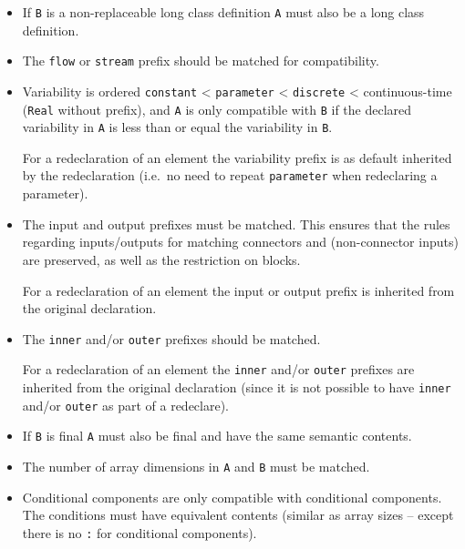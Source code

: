 \begin{itemize}
  \begin{itemize}
  \item
    If \lstinline!B! is a non-replaceable long class definition \lstinline!A! must also be a
    long class definition.
  \item
    The \lstinline!flow! or \lstinline!stream! prefix should be matched for compatibility.
  \item
    Variability is ordered \lstinline!constant! \textless{} \lstinline!parameter! \textless{}
    \lstinline!discrete! \textless{} continuous-time (\lstinline!Real! without prefix), and \lstinline!A! is
    only compatible with \lstinline!B! if the declared variability in \lstinline!A! is less than
    or equal the variability in \lstinline!B!.
    \begin{nonnormative}
    For a redeclaration of an element the variability prefix is as default inherited by the redeclaration (i.e.\ no need to repeat \lstinline!parameter!
    when redeclaring a parameter).
    \end{nonnormative}
  \item
    The input and output prefixes must be matched. This ensures that the
    rules regarding inputs/outputs for matching connectors and
    (non-connector inputs) are preserved, as well as the restriction on
    blocks.
    \begin{nonnormative}
    For a redeclaration of an element the input or output prefix is inherited from the original declaration.
    \end{nonnormative}
  \item
    The \lstinline!inner! and/or \lstinline!outer! prefixes should be matched.
    \begin{nonnormative}
    For a redeclaration of an element the \lstinline!inner! and/or \lstinline!outer! prefixes are inherited from the original declaration (since it is not
    possible to have \lstinline!inner! and/or \lstinline!outer! as part of a redeclare).
    \end{nonnormative}
  \item
    If \lstinline!B! is final \lstinline!A! must also be final and have the same semantic
    contents.
  \item
    The number of array dimensions in \lstinline!A! and \lstinline!B! must be matched.
  \item
    Conditional components are only compatible with conditional
    components. The conditions must have equivalent contents (similar as
    array sizes -- except there is no \lstinline!:! for conditional components).

\end{itemize}
\end{itemize}
